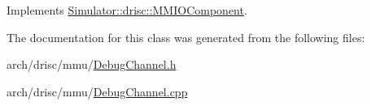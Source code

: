 Implements \hyperlink{class_simulator_1_1drisc_1_1_m_m_i_o_component_aab3662058e7a00109b122a1460188a8b}{Simulator\+::drisc\+::\+M\+M\+I\+O\+Component}.



The documentation for this class was generated from the following files\+:\begin{DoxyCompactItemize}
\item 
arch/drisc/mmu/\hyperlink{_debug_channel_8h}{Debug\+Channel.\+h}\item 
arch/drisc/mmu/\hyperlink{_debug_channel_8cpp}{Debug\+Channel.\+cpp}\end{DoxyCompactItemize}
